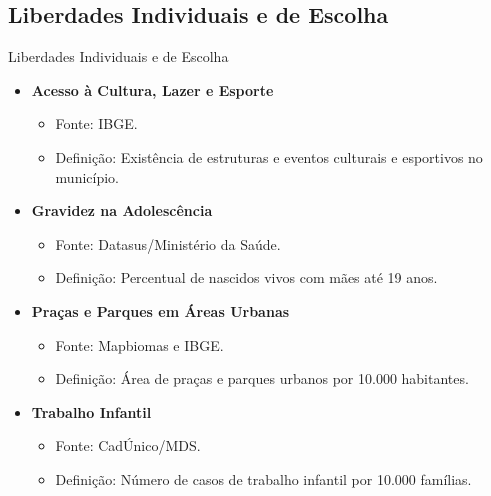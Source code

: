 \documentclass{beamer}
\begin{document}
\subsection{Liberdades Individuais e de Escolha}
\begin{frame}{Liberdades Individuais e de Escolha}
\begin{itemize}
    \item \textbf{Acesso à Cultura, Lazer e Esporte}
    \begin{itemize}
        \item Fonte: IBGE.
        \item Definição: Existência de estruturas e eventos culturais e esportivos no município.
    \end{itemize}
    \item \textbf{Gravidez na Adolescência}
    \begin{itemize}
        \item Fonte: Datasus/Ministério da Saúde.
        \item Definição: Percentual de nascidos vivos com mães até 19 anos.
    \end{itemize}
    \item \textbf{Praças e Parques em Áreas Urbanas}
    \begin{itemize}
        \item Fonte: Mapbiomas e IBGE.
        \item Definição: Área de praças e parques urbanos por 10.000 habitantes.
    \end{itemize}
    \item \textbf{Trabalho Infantil}
    \begin{itemize}
        \item Fonte: CadÚnico/MDS.
        \item Definição: Número de casos de trabalho infantil por 10.000 famílias.
    \end{itemize}
\end{itemize}
\end{frame}
\end{document}
